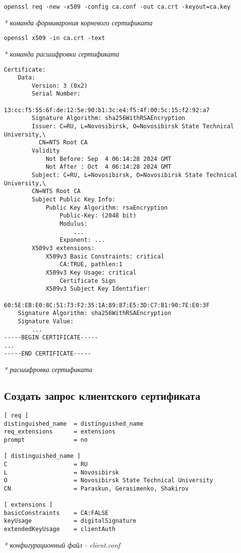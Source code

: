 \documentclass[12pt, a4paper]{article}
\begin{document}
\begin{verbatim}
openssl req -new -x509 -config ca.conf -out ca.crt -keyout=ca.key
\end{verbatim}
\textit{* команда формиварония корневого сертификата}

\begin{verbatim}
openssl x509 -in ca.crt -text 
\end{verbatim}
\textit{* команда расшифровки сертификата}

\begin{verbatim}
Certificate:
    Data:
        Version: 3 (0x2)
        Serial Number:
            13:cc:f5:55:6f:de:12:5e:90:b1:3c:e4:f5:4f:00:5c:15:f2:92:a7
        Signature Algorithm: sha256WithRSAEncryption
        Issuer: C=RU, L=Novosibirsk, O=Novosibirsk State Technical University,\
          CN=NTS Root CA
        Validity
            Not Before: Sep  4 06:14:28 2024 GMT
            Not After : Oct  4 06:14:28 2024 GMT
        Subject: C=RU, L=Novosibirsk, O=Novosibirsk State Technical University,\
        CN=NTS Root CA
        Subject Public Key Info:
            Public Key Algorithm: rsaEncryption
                Public-Key: (2048 bit)
                Modulus:
                    ...
                Exponent: ...
        X509v3 extensions:
            X509v3 Basic Constraints: critical
                CA:TRUE, pathlen:1
            X509v3 Key Usage: critical
                Certificate Sign
            X509v3 Subject Key Identifier:
                60:5E:EB:E0:8C:51:73:F2:35:1A:89:87:E5:3D:C7:B1:90:7E:E0:3F
    Signature Algorithm: sha256WithRSAEncryption
    Signature Value:
        ...
-----BEGIN CERTIFICATE-----
...
-----END CERTIFICATE-----
\end{verbatim}
\textit{* расшифровка сертификата}

\subsection{Создать запрос клиентского сертификата}

\begin{verbatim}
[ req ]
distinguished_name  = distinguished_name
req_extensions      = extensions
prompt              = no

[ distinguished_name ]
C                   = RU
L                   = Novosibirsk
O                   = Novosibirsk State Technical University
CN                  = Paraskun, Gerasimenko, Shakirov

[ extensions ]
basicConstraints    = CA:FALSE
keyUsage            = digitalSignature
extendedKeyUsage    = clientAuth
\end{verbatim}
\textit{* конфигурационный файл - client.conf}
\end{document}
